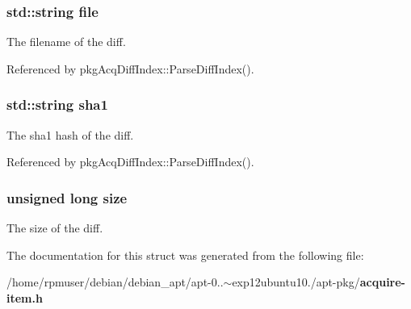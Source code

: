 \subsubsection[{file}]{\setlength{\rightskip}{0pt plus 5cm}std\-::string {\bf file}}\label{structDiffInfo_aefc35c7944eed319c89bc1b399f0eb67}
\-The filename of the diff. 

\-Referenced by pkg\-Acq\-Diff\-Index\-::\-Parse\-Diff\-Index().

\subsubsection[{sha1}]{\setlength{\rightskip}{0pt plus 5cm}std\-::string {\bf sha1}}\label{structDiffInfo_afec3c3f7721f07dd59393b9bfff9e1dd}
\-The sha1 hash of the diff. 

\-Referenced by pkg\-Acq\-Diff\-Index\-::\-Parse\-Diff\-Index().

\subsubsection[{size}]{\setlength{\rightskip}{0pt plus 5cm}unsigned long {\bf size}}\label{structDiffInfo_a1e1268d164c38e4f8a4f4eb9058b0601}
\-The size of the diff. 

\-The documentation for this struct was generated from the following file\-:\begin{DoxyCompactItemize}
\item 
/home/rpmuser/debian/debian\-\_\-apt/apt-\/0..$\sim$exp12ubuntu10./apt-\/pkg/{\bf acquire-\/item.\-h}\end{DoxyCompactItemize}

